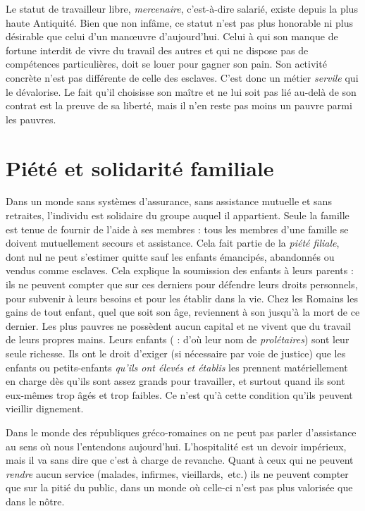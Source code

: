  Le statut de travailleur libre, \emph{mercenaire}, c'est-à-dire salarié, existe depuis la plus haute Antiquité. Bien que non infâme, ce statut n'est pas plus honorable ni plus désirable que celui d'un manœuvre d'aujourd'hui. Celui à qui son manque de fortune interdit de vivre du travail des autres et qui ne dispose pas de compétences particulières, doit se louer pour gagner son pain. Son activité concrète n'est pas différente de celle des esclaves. C'est donc un métier \emph{servile} qui le dévalorise. Le fait qu'il choisisse son maître et ne lui soit pas lié au-delà de son contrat est la preuve de sa liberté, mais il n'en reste pas moins un pauvre parmi les pauvres. 


\section{Piété et solidarité familiale}

 Dans un monde sans systèmes d'assurance, sans assistance mutuelle et sans retraites, l'individu est solidaire du groupe auquel il appartient. Seule la famille est tenue de fournir de l'aide à ses membres : tous les membres d'une famille se doivent mutuellement secours et assistance. Cela fait partie de la \emph{piété filiale}, dont nul ne peut s'estimer quitte sauf les enfants émancipés, abandonnés ou vendus comme esclaves. Cela explique la soumission des enfants à leurs parents : ils ne peuvent compter que sur ces derniers pour défendre leurs droits personnels, pour subvenir à leurs besoins et pour les établir dans la vie. Chez les Romains les gains de tout enfant, quel que soit son âge, reviennent à son  jusqu'à la mort de ce dernier. Les plus pauvres ne possèdent aucun capital et ne vivent que du travail de leurs propres mains. Leurs enfants ( : d'où leur nom de \emph{prolétaires}) sont leur seule richesse. Ils ont le droit d'exiger (si nécessaire par voie de justice) que les enfants ou petits-enfants \emph{qu'ils ont élevés et établis} les prennent matériellement en charge dès qu'ils sont assez grands pour travailler, et surtout quand ils sont eux-mêmes trop âgés et trop faibles. Ce n'est qu'à cette condition qu'ils peuvent vieillir dignement. 

 Dans le monde des républiques gréco-romaines on ne peut pas parler d'assistance au sens où nous l'entendons aujourd'hui. L'hospitalité est un devoir impérieux, mais il va sans dire que c'est à charge de revanche. Quant à ceux qui ne peuvent \emph{rendre} aucun service (malades, infirmes, vieillards,~etc.) ils ne peuvent compter que sur la pitié du public, dans un monde où celle-ci n'est pas plus valorisée que dans le nôtre.

